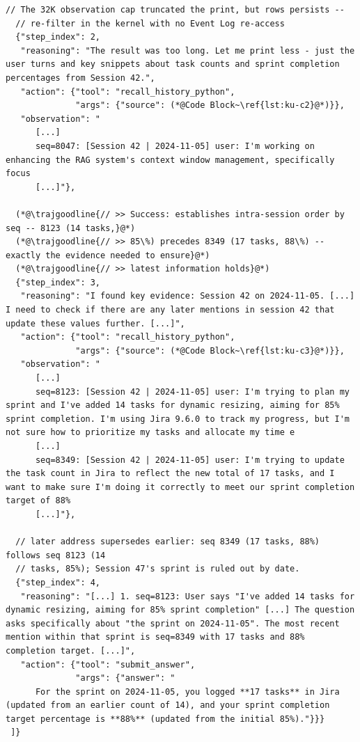 \begin{lstlisting}[style=traj]
  // The 32K observation cap truncated the print, but rows persists -- 
  // re-filter in the kernel with no Event Log re-access
  {"step_index": 2,
   "reasoning": "The result was too long. Let me print less - just the user turns and key snippets about task counts and sprint completion percentages from Session 42.",
   "action": {"tool": "recall_history_python",
              "args": {"source": (*@Code Block~\ref{lst:ku-c2}@*)}},
   "observation": "
      [...]
      seq=8047: [Session 42 | 2024-11-05] user: I'm working on enhancing the RAG system's context window management, specifically focus
      [...]"},

  (*@\trajgoodline{// >> Success: establishes intra-session order by seq -- 8123 (14 tasks,}@*)
  (*@\trajgoodline{// >> 85\%) precedes 8349 (17 tasks, 88\%) -- exactly the evidence needed to ensure}@*)
  (*@\trajgoodline{// >> latest information holds}@*)
  {"step_index": 3,
   "reasoning": "I found key evidence: Session 42 on 2024-11-05. [...] I need to check if there are any later mentions in session 42 that update these values further. [...]",
   "action": {"tool": "recall_history_python",
              "args": {"source": (*@Code Block~\ref{lst:ku-c3}@*)}},
   "observation": "
      [...]
      seq=8123: [Session 42 | 2024-11-05] user: I'm trying to plan my sprint and I've added 14 tasks for dynamic resizing, aiming for 85% sprint completion. I'm using Jira 9.6.0 to track my progress, but I'm not sure how to prioritize my tasks and allocate my time e
      [...]
      seq=8349: [Session 42 | 2024-11-05] user: I'm trying to update the task count in Jira to reflect the new total of 17 tasks, and I want to make sure I'm doing it correctly to meet our sprint completion target of 88%
      [...]"},

  // later address supersedes earlier: seq 8349 (17 tasks, 88%) follows seq 8123 (14
  // tasks, 85%); Session 47's sprint is ruled out by date.
  {"step_index": 4,
   "reasoning": "[...] 1. seq=8123: User says "I've added 14 tasks for dynamic resizing, aiming for 85% sprint completion" [...] The question asks specifically about "the sprint on 2024-11-05". The most recent mention within that sprint is seq=8349 with 17 tasks and 88% completion target. [...]",
   "action": {"tool": "submit_answer",
              "args": {"answer": "
      For the sprint on 2024-11-05, you logged **17 tasks** in Jira (updated from an earlier count of 14), and your sprint completion target percentage is **88%** (updated from the initial 85%)."}}}
 ]}
\end{lstlisting}

